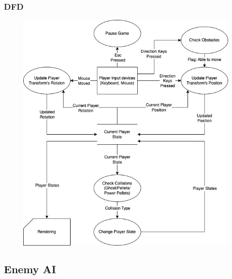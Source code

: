 \documentclass[11pt]{article}
\begin{document}
\subsubsection{DFD}
\begin{figure}[H]
    \centering
    \includegraphics*[scale=0.4]{PlayerControl_DFD.png}
\end{figure}

\subsection{Enemy AI}
\end{document}
